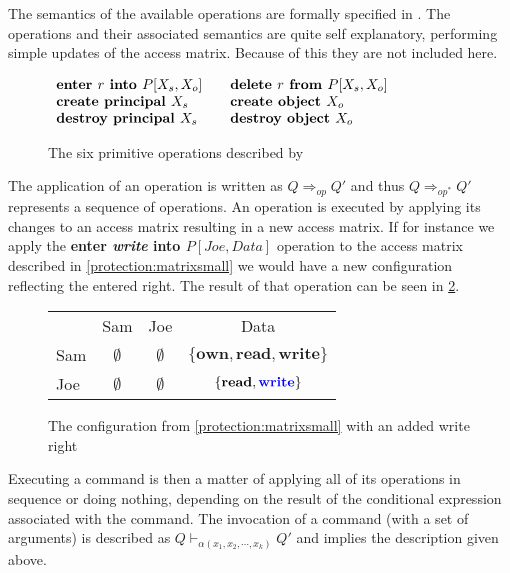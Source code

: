 The semantics of the available operations are formally specified in \citet[p. 463]{HRU}.
The operations and their associated semantics are quite self explanatory, performing simple updates of the access matrix.
Because of this they are not included here.

\begin{figure}
\centering
$\begin{array}{l l}
  \textbf{enter } r \textbf{ into } P[X_s, X_o]\quad & \textbf{delete } r \textbf{ from } P[X_s, X_o]\\
  \textbf{create principal{} } X_s & \textbf{create object } X_o\\
  \textbf{destroy principal{} } X_s & \textbf{destroy object } X_o
 \end{array}$
 \caption{The six primitive operations described by \citet{HRU}}
 \label{protection:operations}
\end{figure}

The application of an operation is written as $Q \Rightarrow_{op} Q'$ and thus $Q \Rightarrow_{op^*} Q'$ represents a sequence of operations.
An operation is executed by applying its changes to an access matrix resulting in a new access matrix.
If for instance we apply the \textbf{enter \textit{write} into $P[Joe, Data]$} operation to the access matrix described in \cref{protection:matrixsmall} we would have a new configuration reflecting the entered right.
The result of that operation can be seen in \cref{protection:matrixwithwrite}.

\begin{figure}
\centering
\begin{tabular}{l|c|c|c|}
\multicolumn{1}{c}{} & \multicolumn{1}{c}{Sam} & \multicolumn{1}{c}{Joe} & \multicolumn{1}{c}{Data} \\\cline{2-4}
Sam & $\emptyset$ & $\emptyset$ & $\{\textbf{own}, \textbf{read}, \textbf{write}\}$ \\\cline{2-4}
Joe & $\emptyset$ & $\emptyset$ & $\{\textbf{read}, {\color{blue}\textbf{write}}\}$ \\\cline{2-4}
\end{tabular}
\caption{The configuration from \cref{protection:matrixsmall} with an added write right}
\label{protection:matrixwithwrite}
\end{figure}

Executing a command is then a matter of applying all of its operations in sequence or doing nothing, depending on the result of the conditional expression associated with the command.
The invocation of a command (with a set of arguments) is described as $Q \vdash_{\alpha(x_1, x_2, \cdots, x_k)} Q'$ and implies the description given above.

